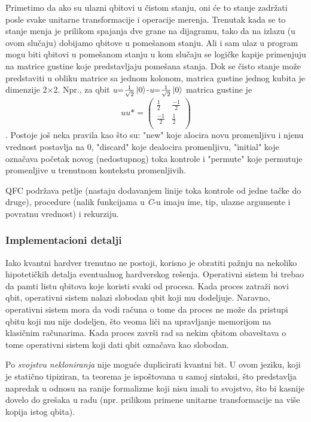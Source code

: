 \documentclass[a4paper]{article}
\begin{document}
{Primetimo da ako su ulazni qbitovi u čistom stanju, oni će to stanje zadržati posle svake unitarne transformacije i operacije merenja. Trenutak kada se to stanje menja je prilikom spajanja dve grane na dijagramu, tako da na izlazu (u ovom slučaju) dobijamo qbitove u pomešanom stanju. Ali i sam ulaz u program mogu biti qbitovi u pomešanom stanju u kom slučaju se logičke kapije primenjuju na matrice gustine koje predstavljaju pomešana stanja. Dok se čisto stanje može predstaviti u obliku matrice sa jednom kolonom, matrica gustine jednog kubita je dimenzije 2$\times$2. Npr., za qbit \textit{u}=$\frac{1}{\sqrt{2}}\ket{0}$-\textit{u}=$\frac{1}{\sqrt{2}}\ket{0}$ 
matrica gustine je \[\textit{uu*}= \left( \begin{array}{cc}
\frac{1}{2} & \frac{-1}{2} \\
\frac{-1}{2} & \frac{1}{2} \\
\end{array} \right)\].
Postoje još neka pravila kao što su: "new" koje alocira novu promenljivu i njenu vrednost postavlja na 0, "discard" koje dealocira promenljivu, "initial" koje označava početak novog (nedostupnog) toka kontrole i "permute" koje permutuje promenljive u trenutnom kontekstu promenljivih.

QFC podržava petlje (nastaju dodavanjem linije toka kontrole od jedne tačke do druge), procedure (nalik funkcijama u \emph{C}-u imaju ime, tip, ulazne argumente i povratnu vrednost) i rekurziju.

\subsubsection{Implementacioni detalji}

Iako kvantni hardver trenutno ne postoji, korisno je obratiti pažnju na nekoliko hipotetičkih detalja eventualnog hardverskog rešenja. Operativni sistem bi trebao da pamti listu qbitova koje koristi svaki od procesa. Kada proces zatraži novi qbit, operativni sistem nalazi slobodan qbit koji mu dodeljuje. Naravno, operativni sistem mora da vodi računa o tome da proces ne može da pristupi qbitu koji mu nije dodeljen, što veoma liči na upravljanje memorijom na klasičnim računarima. Kada proces završi rad sa nekim qbitom obaveštava o tome operativni sistem koji dati qbit označava kao slobodan.

Po \textit{svojstvu nekloniranja} nije moguće duplicirati kvantni bit. U ovom jeziku, koji je statično tipiziran, ta teorema je ispoštovana u samoj sintaksi, što predstavlja napredak u odnosu na ranije formalizme koji nisu imali to svojstvo, što bi kasnije dovelo do grešaka u radu (npr. prilikom primene unitarne transformacije na više kopija istog qbita).

}
\end{document}

